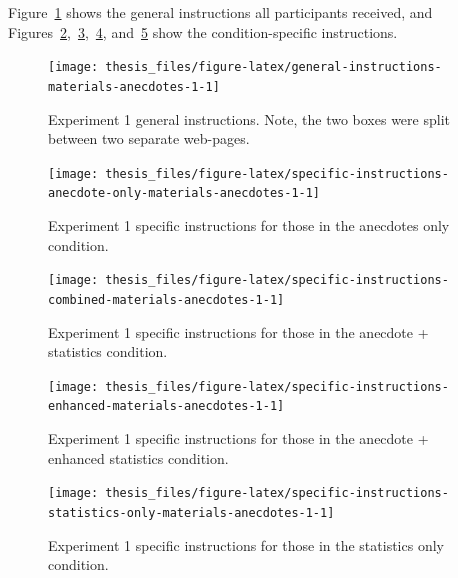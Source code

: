 \documentclass[a4paper, nobind, dvipsnames]{templates/ociamthesis}
\theoremstyle{definition}
\theoremstyle{definition}
\theoremstyle{definition}
\theoremstyle{definition}
\theoremstyle{remark}
\begin{document}
Figure~\ref{fig:general-instructions-materials-anecdotes-1} shows the general
instructions all participants received, and
Figures~\ref{fig:specific-instructions-anecdote-only-materials-anecdotes-1},~\ref{fig:specific-instructions-combined-materials-anecdotes-1},~\ref{fig:specific-instructions-enhanced-materials-anecdotes-1},
and~\ref{fig:specific-instructions-statistics-only-materials-anecdotes-1} show
the condition-specific instructions.



\begin{figure}
\texttt{[image: thesis\_files/figure-latex/general-instructions-materials-anecdotes-1-1]} \caption{Experiment 1 general instructions. Note, the two boxes were split between two separate web-pages.}\label{fig:general-instructions-materials-anecdotes-1}
\end{figure}



\begin{figure}
\texttt{[image: thesis\_files/figure-latex/specific-instructions-anecdote-only-materials-anecdotes-1-1]} \caption{Experiment 1 specific instructions for those in the anecdotes only condition.}\label{fig:specific-instructions-anecdote-only-materials-anecdotes-1}
\end{figure}



\begin{figure}
\texttt{[image: thesis\_files/figure-latex/specific-instructions-combined-materials-anecdotes-1-1]} \caption{Experiment 1 specific instructions for those in the anecdote + statistics condition.}\label{fig:specific-instructions-combined-materials-anecdotes-1}
\end{figure}



\begin{figure}
\texttt{[image: thesis\_files/figure-latex/specific-instructions-enhanced-materials-anecdotes-1-1]} \caption{Experiment 1 specific instructions for those in the anecdote + enhanced statistics condition.}\label{fig:specific-instructions-enhanced-materials-anecdotes-1}
\end{figure}



\begin{figure}
\texttt{[image: thesis\_files/figure-latex/specific-instructions-statistics-only-materials-anecdotes-1-1]} \caption{Experiment 1 specific instructions for those in the statistics only condition.}\label{fig:specific-instructions-statistics-only-materials-anecdotes-1}
\end{figure}
\end{document}
